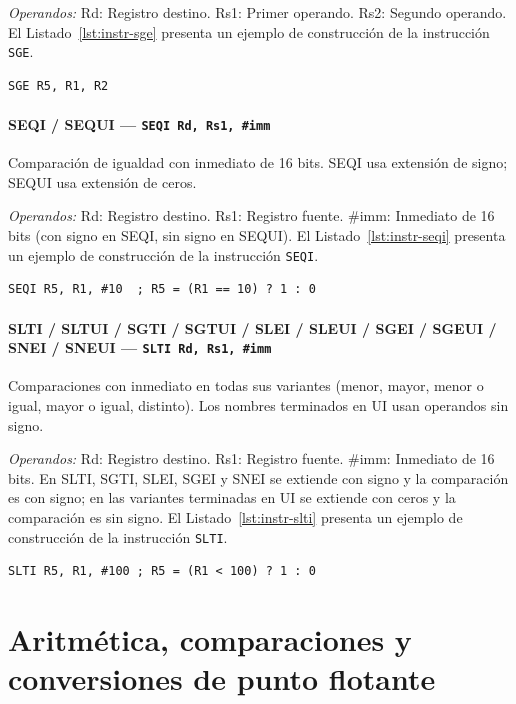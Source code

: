 \documentclass[../main.tex]{subfiles}
\begin{document}
\textit{Operandos:} Rd: Registro destino. Rs1: Primer operando. Rs2: Segundo operando.
El Listado~\ref{lst:instr-sge} presenta un ejemplo de construcción de la instrucción \texttt{SGE}.

\begin{lstlisting}[caption={SGE},label={lst:instr-sge}]
	SGE R5, R1, R2
\end{lstlisting}

\paragraph*{SEQI / SEQUI --- \texttt{SEQI Rd, Rs1, \#imm}}
Comparación de igualdad con inmediato de 16 bits. SEQI usa extensión de signo; SEQUI usa extensión de ceros.

\textit{Operandos:} Rd: Registro destino. Rs1: Registro fuente. \#imm: Inmediato de 16 bits (con signo en SEQI, sin signo en SEQUI).
El Listado~\ref{lst:instr-seqi} presenta un ejemplo de construcción de la instrucción \texttt{SEQI}.

\begin{lstlisting}[caption={SEQI},label={lst:instr-seqi}]
	SEQI R5, R1, #10  ; R5 = (R1 == 10) ? 1 : 0
\end{lstlisting}

\paragraph*{SLTI / SLTUI / SGTI / SGTUI / SLEI / SLEUI / SGEI / SGEUI / SNEI / SNEUI --- \texttt{SLTI Rd, Rs1, \#imm}}
Comparaciones con inmediato en todas sus variantes (menor, mayor, menor o igual, mayor o igual, distinto). Los nombres terminados en UI usan operandos sin signo.

\textit{Operandos:} Rd: Registro destino. Rs1: Registro fuente. \#imm: Inmediato de 16 bits. En SLTI, SGTI, SLEI, SGEI y SNEI se extiende con signo y la comparación es con signo; en las variantes terminadas en UI se extiende con ceros y la comparación es sin signo.
El Listado~\ref{lst:instr-slti} presenta un ejemplo de construcción de la instrucción \texttt{SLTI}.

\begin{lstlisting}[caption={SLTI},label={lst:instr-slti}]
	SLTI R5, R1, #100 ; R5 = (R1 < 100) ? 1 : 0
\end{lstlisting}

\section{Aritmética, comparaciones y conversiones de punto flotante}
\end{document}
